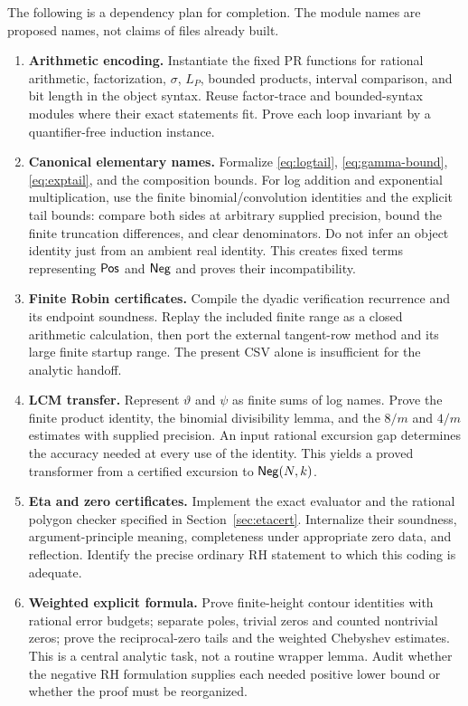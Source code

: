The following is a dependency plan for completion. The module names
are proposed names, not claims of files already built.

\begin{enumerate}[leftmargin=*]
\item \textbf{Arithmetic encoding.}
Instantiate the fixed PR functions for rational arithmetic,
factorization, $\sigma$, $L_P$, bounded products, interval comparison,
and bit length in the object syntax. Reuse factor-trace and
bounded-syntax modules where their exact statements fit.
Prove each loop invariant by a quantifier-free induction instance.

\item \textbf{Canonical elementary names.}
Formalize \eqref{eq:logtail}, \eqref{eq:gamma-bound},
\eqref{eq:exptail}, and the composition bounds.
For log addition and exponential multiplication, use the finite
binomial/convolution identities and the explicit tail bounds:
compare both sides at arbitrary supplied precision, bound the
finite truncation differences, and clear denominators.
Do not infer an object identity just from an ambient real identity.
This creates fixed terms representing $\mathsf{Pos}$ and $\mathsf{Neg}$ and proves
their incompatibility.

\item \textbf{Finite Robin certificates.}
Compile the dyadic verification recurrence and its endpoint
soundness. Replay the included finite range as a closed arithmetic
calculation, then port the external tangent-row method and its
large finite startup range. The present CSV alone is insufficient
for the analytic handoff.

\item \textbf{LCM transfer.}
Represent $\vartheta$ and $\psi$ as finite sums of log names.
Prove the finite product identity, the binomial divisibility
lemma, and the $8/m$ and $4/m$ estimates with supplied precision.
An input rational excursion gap determines the accuracy needed
at every use of the identity. This yields a proved transformer
from a certified excursion to $\mathsf{Neg}(N,k)$.

\item \textbf{Eta and zero certificates.}
Implement the exact evaluator and the rational polygon checker
specified in Section~\ref{sec:etacert}. Internalize their soundness,
argument-principle meaning, completeness under appropriate zero
data, and reflection. Identify the precise ordinary RH statement
to which this coding is adequate.

\item \textbf{Weighted explicit formula.}
Prove finite-height contour identities with rational error budgets;
separate poles, trivial zeros and counted nontrivial zeros; prove
the reciprocal-zero tails and the weighted Chebyshev estimates.
This is a central analytic task, not a routine wrapper lemma.
Audit whether the negative RH formulation supplies each needed
positive lower bound or whether the proof must be reorganized.


\end{enumerate}
